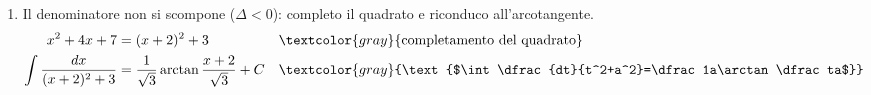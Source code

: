 \begin{question}[ID=1.1, subtitle={Integrali indefiniti — serie 1}, tags={integrali, indefiniti}, difficulty=media]
\begin{explanation}
\begin{enumerate}
\[\begin{aligned}
    x=-5:\ -7 &= -6B \;\Rightarrow\; B=\dfrac76
    \end{aligned}\]
    Integro ogni frazione come un logaritmo: $\tfrac56\ln|x-1|+\tfrac76\ln|x+5|+C$.
    \item Il denominatore non si scompone ($\Delta<0$): completo il quadrato e riconduco all'arcotangente.
    \[\begin{aligned}
    x^2+4x+7 &= (x+2)^2+3 && \textcolor{gray}{\text{completamento del quadrato}}\\
    \int\dfrac{dx}{(x+2)^2+3} &= \dfrac{1}{\sqrt3}\arctan\dfrac{x+2}{\sqrt3}+C && \textcolor{gray}{\text{$\int\dfrac{dt}{t^2+a^2}=\dfrac1a\arctan\dfrac ta$}}
    \end{aligned}\]
\end{enumerate}
\end{explanation}
\end{question}



